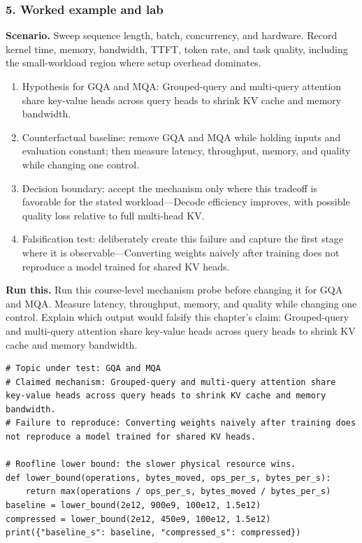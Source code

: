 \subsubsection*{5. Worked example and lab}
\textbf{Scenario.} Sweep sequence length, batch, concurrency, and hardware. Record kernel time, memory, bandwidth, TTFT, token rate, and task quality, including the small-workload region where setup overhead dominates.
\begin{enumerate}
\item Hypothesis for GQA and MQA: Grouped-query and multi-query attention share key-value heads across query heads to shrink KV cache and memory bandwidth.
\item Counterfactual baseline: remove GQA and MQA while holding inputs and evaluation constant; then measure latency, throughput, memory, and quality while changing one control.
\item Decision boundary: accept the mechanism only where this tradeoff is favorable for the stated workload—Decode efficiency improves, with possible quality loss relative to full multi-head KV.
\item Falsification test: deliberately create this failure and capture the first stage where it is observable—Converting weights naively after training does not reproduce a model trained for shared KV heads.
\end{enumerate}
\textbf{Run this.} Run this course-level mechanism probe before changing it for GQA and MQA. Measure latency, throughput, memory, and quality while changing one control. Explain which output would falsify this chapter's claim: Grouped-query and multi-query attention share key-value heads across query heads to shrink KV cache and memory bandwidth.
\begin{Verbatim}[fontsize=\scriptsize]
# Topic under test: GQA and MQA
# Claimed mechanism: Grouped-query and multi-query attention share key-value heads across query heads to shrink KV cache and memory bandwidth.
# Failure to reproduce: Converting weights naively after training does not reproduce a model trained for shared KV heads.

# Roofline lower bound: the slower physical resource wins.
def lower_bound(operations, bytes_moved, ops_per_s, bytes_per_s):
    return max(operations / ops_per_s, bytes_moved / bytes_per_s)
baseline = lower_bound(2e12, 900e9, 100e12, 1.5e12)
compressed = lower_bound(2e12, 450e9, 100e12, 1.5e12)
print({"baseline_s": baseline, "compressed_s": compressed})
\end{Verbatim}
